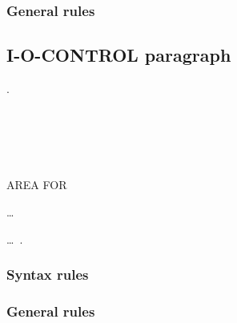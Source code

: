 \subsubsection{General rules}

\subsection{I-O-CONTROL paragraph}
\begin{syntax}
  \begin{0-1}
    .
  \end{0-1}\newline
  \begin{1=}
     \\
    
    \begin{0-1}
       \\
       \\
    \end{0-1}
    AREA FOR
    \begin{1=}
      \filename
    \end{1=}\ldots \\

  \end{1=}\ldots\ {}.
\end{syntax}

\subsubsection{Syntax rules}

\subsubsection{General rules}

